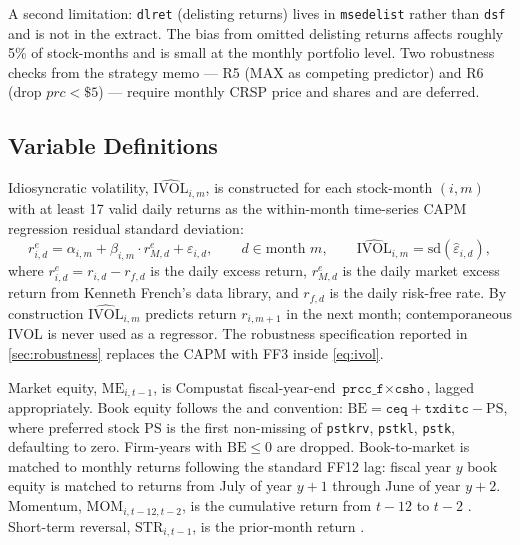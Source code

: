 \documentclass[12pt]{article}
\newcommand{\1}[1]{\mathds{1}\left[#1\right]}
\begin{document}
A second limitation: \texttt{dlret} (delisting returns) lives in
\texttt{msedelist} rather than \texttt{dsf} and is not in the extract. The
\citet{shumway1997delisting} bias from omitted delisting returns affects
roughly 5\% of stock-months and is small at the monthly portfolio level. Two
robustness checks from the strategy memo --- R5 (MAX as competing predictor)
and R6 (drop $prc<\$5$) --- require monthly CRSP price and shares and are
deferred.

\subsection{Variable Definitions}

Idiosyncratic volatility, $\widehat{\mathrm{IVOL}}_{i,m}$, is constructed for
each stock-month $(i,m)$ with at least 17 valid daily returns as the
within-month time-series CAPM regression residual standard deviation:
\begin{equation}\label{eq:ivol}
r^e_{i,d} = \alpha_{i,m} + \beta_{i,m} \cdot r^e_{M,d} + \varepsilon_{i,d},
\qquad d \in \text{month } m, \qquad
\widehat{\mathrm{IVOL}}_{i,m} = \mathrm{sd}(\widehat{\varepsilon}_{i,d}),
\end{equation}
where $r^e_{i,d} = r_{i,d} - r_{f,d}$ is the daily excess return,
$r^e_{M,d}$ is the daily market excess return from Kenneth French's data
library, and $r_{f,d}$ is the daily risk-free rate. By construction
$\widehat{\mathrm{IVOL}}_{i,m}$ predicts return $r_{i,m+1}$ in the next
month; contemporaneous IVOL is never used as a regressor. The robustness
specification reported in \cref{sec:robustness} replaces the CAPM with FF3
inside \eqref{eq:ivol}.

Market equity, $\mathrm{ME}_{i,t-1}$, is Compustat fiscal-year-end
$\texttt{prcc\_f} \times \texttt{csho}$, lagged appropriately. Book equity
follows the \citet{fama1993common} and \citet{davis2000characteristics}
convention: $\mathrm{BE} = \texttt{ceq} + \texttt{txditc} - \mathrm{PS}$,
where preferred stock $\mathrm{PS}$ is the first non-missing of \texttt{pstkrv},
\texttt{pstkl}, \texttt{pstk}, defaulting to zero. Firm-years with
$\mathrm{BE} \le 0$ are dropped. Book-to-market is matched to monthly returns
following the standard FF12 lag: fiscal year $y$ book equity is matched to
returns from July of year $y{+}1$ through June of year $y{+}2$. Momentum,
$\mathrm{MOM}_{i,t-12,t-2}$, is the cumulative return from $t{-}12$ to $t{-}2$
\citep{jegadeesh1993returns}. Short-term reversal, $\mathrm{STR}_{i,t-1}$, is
the prior-month return \citep{huang2010return}.
\end{document}
